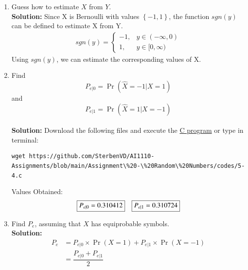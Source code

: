 \documentclass[journal,12pt,twocolumn]{IEEEtran}
\numberwithin{equation}{section}
\renewcommand\thesection{\arabic{section}}
\providecommand{\pr}[1]{\ensuremath{\Pr\left(#1\right)}}
\providecommand{\brak}[1]{\ensuremath{\left(#1\right)}}
\providecommand{\cbrak}[1]{\ensuremath{\left\{#1\right\}}}
\providecommand{\gitlink}[2]{{\color{blue}\href{https://github.com/SterbenVD/AI1110-Assignments/blob/main/Assignment\%20-\%20Random\%20Numbers/#1}{#2}}}
\newcommand{\solution}{\noindent \textbf{\\ Solution: }}
\begin{document}
\begin{enumerate}[label=\thesection.\arabic*
        ,ref=\thesection.\theenumi]
\begin{figure}[H]
              \caption{Plot of $Y$}
              \label{fig:5_Y}
          \end{figure}
          The following \gitlink{codes/5-3.py}{python code} plots Fig. \ref{fig:5_Y} or type in terminal:
          \begin{lstlisting}
wget https://github.com/SterbenVD/AI1110-Assignments/blob/main/Assignment\%20-\%20Random\%20Numbers/codes/5-3.py
            \end{lstlisting}
    \item Guess how to estimate $X$ from $Y$.
          \solution Since X is Bernoulli with values $\cbrak{-1,1}$,
          the function $sgn\brak{y}$ can be defined to estimate X from Y.
          \begin{align}
              sgn(y) =
              \begin{cases}
                  -1, & y \in (-\infty,0) \\
                  1,  & y \in [0, \infty)
              \end{cases}
          \end{align}
          Using $sgn\brak{y}$, we can estimate the corresponding values of X.
          \label{ml-ch4_sim}
    \item Find
          \begin{equation}
              P_{e|0} = \pr{\hat{X} = -1|X=1}
          \end{equation}
          and
          \begin{equation}
              P_{e|1} = \pr{\hat{X} = 1|X=-1}
          \end{equation}
          \solution Download the following files and execute the \gitlink{codes/5-4.c}{C program} or type in terminal:
          \begin{lstlisting}
wget https://github.com/SterbenVD/AI1110-Assignments/blob/main/Assignment\%20-\%20Random\%20Numbers/codes/5-4.c
              \end{lstlisting}
          Values Obtained:
          \begin{align}
               & \fbox{$P_{e|0} = 0.310412$}
               & \fbox{$P_{e|1} = 0.310724$}
          \end{align}
    \item Find $P_e$, assuming that $X$ has equiprobable symbols.
          \solution
          \begin{align}
              P_e & = P_{e|0} \times \pr{X = 1} + P_{e|1} \times \pr{X = -1} \\
                  & = \dfrac{P_{e|0} + P_{e|1}}{2}

\end{align}
\end{enumerate}
\end{document}
